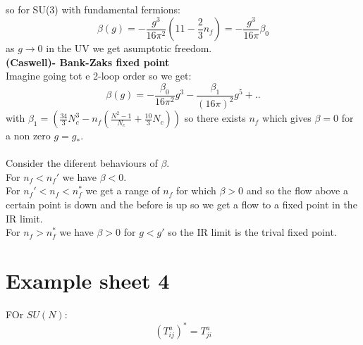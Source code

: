 \documentclass{article}
\begin{document}
 so for SU(3) with fundamental fermions:
 $$
  \beta(g) = - \frac{g^3}{16 \pi^2} ( 11 - \frac{2}{3} n_f) = - \frac{g^3}{16 \pi} \beta_0
 $$
 as $g \rightarrow 0$ in the UV we get asumptotic freedom.\\
 \textbf{(Caswell)- Bank-Zaks fixed point}\\ Imagine going tot e 2-loop order so we get:
 $$ 
 \beta(g) = - \frac{\beta_0}{16 \pi^2} g^3 - \frac{\beta_1}{(16 \pi)^2} g^5 + ..
 $$
 with $\beta_1 = ( \frac{34}{3} N_c^3 - n_f ( \frac{N^2 -1}{N_c} + \frac{10}{3} N_c))$ so there exists $n_f$ which gives $\beta =0$ for a non zero $g= g_*$.\\\\
 Consider the diferent behaviours of $\beta$.\\
 For $n_f < n_f'$ we have $\beta <0$.\\
 For $n_f' < n_f < n_f^*$ we get a range of $n_f$ for which $\beta >0$ and so the flow above a certain point is down and the before is up so we get a flow to a fixed point in the IR limit.\\
 For $n_f > n_f^*$ we  have $\beta>0$ for $g< g'$ so the IR limit is the trival fixed point.
 \section{Example sheet 4}
 FOr $SU(N)$:
 $$
 (T^a_{ij})^* = T_{ji}^a
 $$
       
\end{document}
